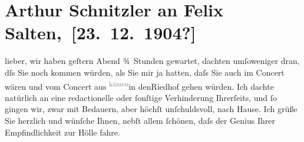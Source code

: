 

         
         \renewcommand{\erwaehntePersonen}{Personen: Felix Salten, Ottilie Salten, Richard Wagner}
         \renewcommand{\erwaehnteOrte}{Orte: Oper, Riedhof, Wien}
         \renewcommand{\erwaehnteWerke}{Werke: Symphonie Nr. 3 D-Moll, Tristan und Isolde}
               \section[ Arthur Schnitzler an Felix Salten, {[}23. 12. 1904?{]}]{ Arthur Schnitzler an Felix Salten, {[}23. 12. 1904?{]}}\nopagebreak{}\rehead{ }\begin{ledgroupsized}[t]{13cm}\normalsize\beginnumbering{} \toendnotes[C]{\smallbreak\pagebreak[2]} 
\toendnotes[C]{\smallbreak}\pstart
           \noindent{}{\pb}lieber, wir haben geſtern{ }Abend ¾ Stunden gewartet, dachten umſoweniger dran, dſs Sie noch kommen
               würden, als Sie mir ja \label{K_L02994-1v}\label{K_L02994-1h} hatten, daſs Sie auch im Concert wären und vom Concert aus \substVorne{}\textsuperscript{\textcolor{gray}{kämen}}\substDazwischen{}in den\substHinten{}{ }Riedhof gehen {\pb}würden. Ich dachte natürlich an eine
               redactionelle oder ſonſtige Verhinderung Ihrerſeits, und ſo gingen wir, zwar mit
               Bedauern, aber höchſt unſchuldsvoll, nach Hause.\pend
           \pstart
           Ich grüße Sie herzlich und wünſche Ihnen, nebſt allem ſchönen, daſs der Genius Ihrer
                  {\pb}Empfindlichkeit zur Hölle fahre.\pend
           \pstart

\end{ledgroupsized}
